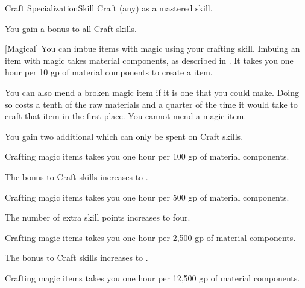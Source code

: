     \begin{feat}{Craft Specialization}{Skill}
        \featpre Craft (any) as a mastered skill.

         You gain a  bonus to all Craft skills.

        [Magical] You can imbue items with magic using your crafting skill.
        Imbuing an item with magic takes material components, as described in .
        It takes you one hour per 10 gp of material components to create a item.

        You can also mend a broken magic item if it is one that you could make.
        Doing so costs a tenth of the raw materials and a quarter of the time it would take to craft that item in the first place.
        You cannot mend a  magic item.

         You gain two additional  which can only be spent on Craft skills.

         Crafting magic items takes you one hour per 100 gp of material components.

         The bonus to Craft skills increases to .

         Crafting magic items takes you one hour per 500 gp of material components.

         The number of extra skill points increases to four.

         Crafting magic items takes you one hour per 2,500 gp of material components.

         The bonus to Craft skills increases to .

         Crafting magic items takes you one hour per 12,500 gp of material components.
    \end{feat}

